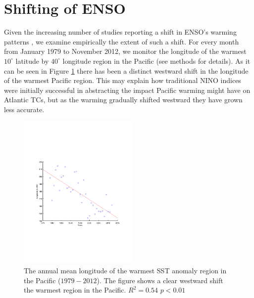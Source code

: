 \section{Shifting of ENSO}
Given the increasing number of studies reporting a shift in ENSO's warming patterns \cite{ashok2007, kao2009contrasting, yeh2009,kug2009two, kim2009}, we examine empirically the extent of such a shift. For every month from January 1979 to November 2012, we monitor the longitude of the warmest $10^\circ$ latitude by $40^\circ$ longitude region in the Pacific (see methods for details). As it can be seen in Figure \ref{fig:figures_scatter} there has been a distinct westward shift in the longitude of the warmest Pacific region. This may explain how traditional NINO indices were initially successful in abstracting the impact Pacific warming might have on Atlantic TCs, but as the warming gradually shifted westward they have grown less accurate.

\begin{figure}[htbp]
	\centering
		\includegraphics[height=3in]{figures/scatter.pdf}
	\caption{The annual mean longitude of the warmest SST anomaly region in the Pacific ($1979-2012$). The figure shows a clear westward shift the warmest region in the Pacific. $R^2 = 0.54$ $p < 0.01$}
	\label{fig:figures_scatter}
\end{figure}


\newpage